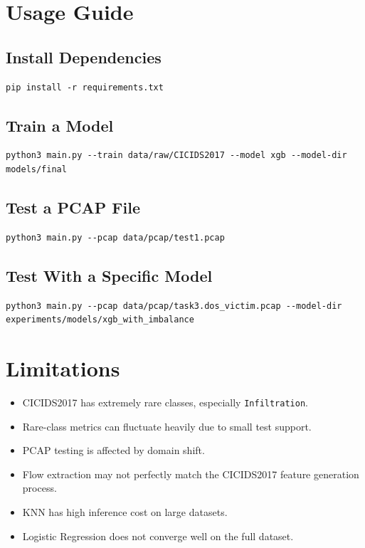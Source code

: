 \documentclass[12pt,a4paper]{article}
\begin{document}
\section{Usage Guide}

\subsection{Install Dependencies}

\begin{lstlisting}
pip install -r requirements.txt
\end{lstlisting}

\subsection{Train a Model}

\begin{lstlisting}
python3 main.py --train data/raw/CICIDS2017 --model xgb --model-dir models/final
\end{lstlisting}

\subsection{Test a PCAP File}

\begin{lstlisting}
python3 main.py --pcap data/pcap/test1.pcap
\end{lstlisting}

\subsection{Test With a Specific Model}

\begin{lstlisting}
python3 main.py --pcap data/pcap/task3.dos_victim.pcap --model-dir experiments/models/xgb_with_imbalance
\end{lstlisting}

\section{Limitations}

\begin{itemize}
    \item CICIDS2017 has extremely rare classes, especially \texttt{Infiltration}.
    \item Rare-class metrics can fluctuate heavily due to small test support.
    \item PCAP testing is affected by domain shift.
    \item Flow extraction may not perfectly match the CICIDS2017 feature generation process.
    \item KNN has high inference cost on large datasets.
    \item Logistic Regression does not converge well on the full dataset.
\end{itemize}
\end{document}

